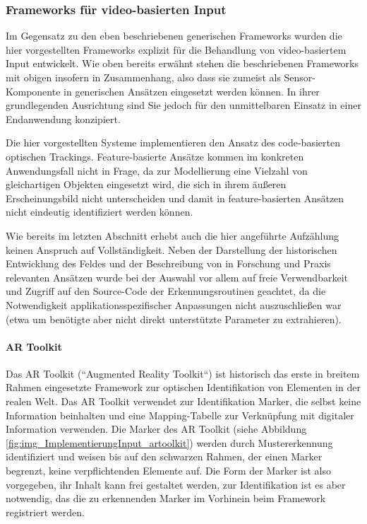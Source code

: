 
\subsubsection{Frameworks für video-basierten Input} %
\label{ssub:frameworks_für_video_basierten_input}

Im Gegensatz zu den eben beschriebenen generischen Frameworks wurden die hier vorgestellten Frameworks explizit für die Behandlung von video-basiertem Input entwickelt. Wie oben bereits erwähnt stehen die beschriebenen Frameworks mit obigen insofern in Zusammenhang, also dass sie zumeist als Sensor-Komponente in generischen Ansätzen eingesetzt werden können. In ihrer grundlegenden Ausrichtung sind Sie jedoch für den unmittelbaren Einsatz in einer Endanwendung konzipiert.

Die hier vorgestellten Systeme implementieren den Ansatz des code-basierten optischen Trackings. Feature-basierte Ansätze kommen im konkreten Anwendungsfall nicht in Frage, da zur Modellierung eine Vielzahl von gleichartigen Objekten eingesetzt wird, die sich in ihrem äußeren Erscheinungsbild nicht unterscheiden und damit in feature-basierten Ansätzen nicht eindeutig identifiziert werden können.

Wie bereits im letzten Abschnitt erhebt auch die hier angeführte Aufzählung keinen Anspruch auf Vollständigkeit. Neben der Darstellung der historischen Entwicklung des Feldes und der Beschreibung von in Forschung und Praxis relevanten Ansätzen wurde bei der Auswahl vor allem auf freie Verwendbarkeit und Zugriff auf den Source-Code der Erkennungsroutinen geachtet, da die Notwendigkeit applikationsspezifischer Anpassungen nicht auszuschließen war (etwa um benötigte aber nicht direkt unterstützte Parameter zu extrahieren).

\paragraph{AR Toolkit}\label{par:artoolkit}
Das AR Toolkit (“Augmented Reality Toolkit“) \citep{Kato00} ist historisch das erste in breitem Rahmen eingesetzte Framework zur optischen Identifikation von Elementen in der realen Welt. Das AR Toolkit verwendet zur Identifikation Marker, die selbst keine Information beinhalten und eine Mapping-Tabelle zur Verknüpfung mit digitaler Information verwenden. Die Marker des AR Toolkit (siehe Abbildung \ref{fig:img_ImplementierungInput_artoolkit}) werden durch Mustererkennung identifiziert und weisen bis auf den schwarzen Rahmen, der einen Marker begrenzt, keine verpflichtenden Elemente auf. Die Form der Marker ist also vorgegeben, ihr Inhalt kann frei gestaltet werden, zur Identifikation ist es aber notwendig, das die zu erkennenden Marker im Vorhinein beim Framework registriert werden. 

